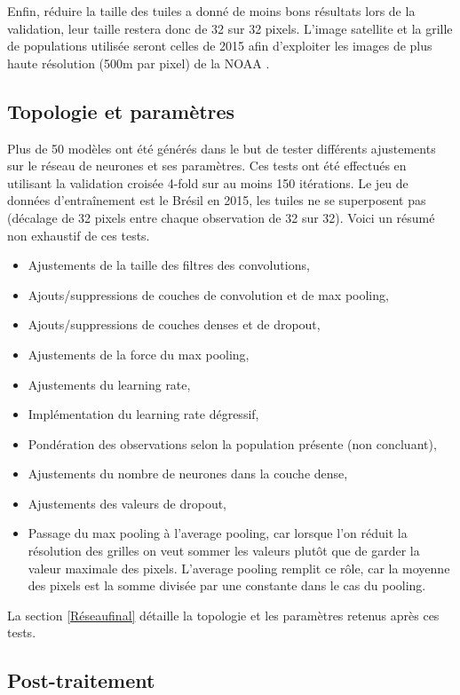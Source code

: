 \documentclass[a4paper, 11pt]{report}
\begin{document}
Enfin, réduire la taille des tuiles a donné de moins bons résultats lors de la validation, leur taille restera donc de 32 sur 32 pixels. L'image satellite et la grille de populations utilisée \cite{sedac} seront celles de 2015 afin d'exploiter les images de plus haute résolution (500m par pixel) de la NOAA \cite{noaa-viirs}.

\subsection{Topologie et paramètres}
Plus de 50 modèles ont été générés dans le but de tester différents ajustements sur le réseau de neurones et ses paramètres. Ces tests ont été effectués en utilisant la validation croisée 4-fold sur au moins 150 itérations. Le jeu de données d'entraînement est le Brésil en 2015, les tuiles ne se superposent pas (décalage de 32 pixels entre chaque observation de 32 sur 32). Voici un résumé non exhaustif de ces tests.

\begin{itemize}
	\item Ajustements de la taille des filtres des convolutions,
	\item Ajouts/suppressions de couches de convolution et de max pooling,
	\item Ajouts/suppressions de couches denses et de dropout,
	\item Ajustements de la force du max pooling,
	\item Ajustements du learning rate,
	\item Implémentation du learning rate dégressif,
	\item Pondération des observations selon la population présente (non concluant),
	\item Ajustements du nombre de neurones dans la couche dense,
	\item Ajustements des valeurs de dropout,
	\item Passage du max pooling à l'average pooling, car lorsque l'on réduit la résolution des grilles on veut sommer les valeurs plutôt que de garder la valeur maximale des pixels. L'average pooling remplit ce rôle, car la moyenne des pixels est la somme divisée par une constante dans le cas du pooling.
\end{itemize}

La section \ref{Réseaufinal} détaille la topologie et les paramètres retenus après ces tests.

\subsection{Post-traitement}
\end{document}
